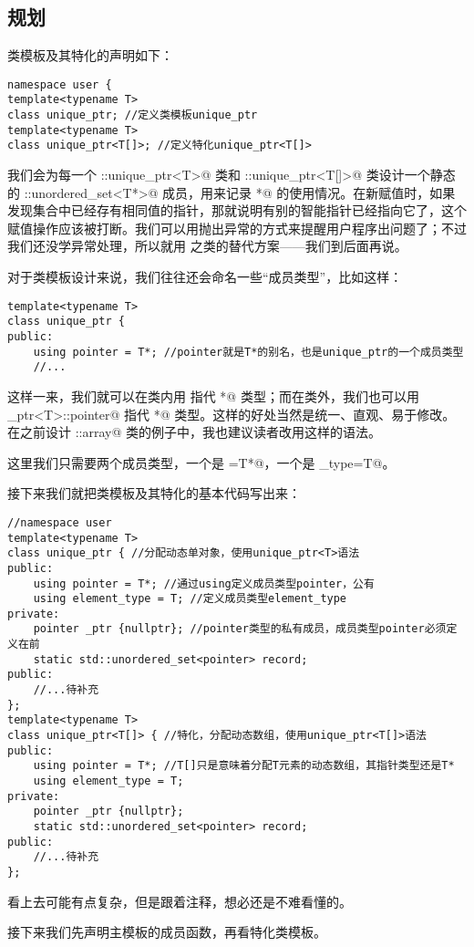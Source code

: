 \subsection*{规划}
类模板及其特化的声明如下：
\begin{lstlisting}
namespace user {
template<typename T>
class unique_ptr; //定义类模板unique_ptr
template<typename T>
class unique_ptr<T[]>; //定义特化unique_ptr<T[]>
\end{lstlisting}\par
我们会为每一个 \lstinline@user::unique_ptr<T>@ 类和 \lstinline@user::unique_ptr<T[]>@ 类设计一个静态的 \lstinline@user::unordered_set<T*>@ 成员，用来记录 \lstinline@T*@ 的使用情况。在新赋值时，如果发现集合中已经存有相同值的指针，那就说明有别的智能指针已经指向它了，这个赋值操作应该被打断。我们可以用抛出异常的方式来提醒用户程序出问题了；不过我们还没学异常处理，所以就用 \lstinline@nullptr@ 之类的替代方案——我们到后面再说。\par
对于类模板设计来说，我们往往还会命名一些``成员类型''，比如这样：
\begin{lstlisting}
template<typename T>
class unique_ptr {
public:
    using pointer = T*; //pointer就是T*的别名，也是unique_ptr的一个成员类型
    //...
\end{lstlisting}
这样一来，我们就可以在类内用 \lstinline@pointer@ 指代 \lstinline@T*@ 类型；而在类外，我们也可以用 \lstinline@unique_ptr<T>::pointer@ 指代 \lstinline@T*@ 类型。这样的好处当然是统一、直观、易于修改。在之前设计 \lstinline@user::array@ 类的例子中，我也建议读者改用这样的语法。\par
这里我们只需要两个成员类型，一个是 \lstinline@pointer=T*@，一个是 \lstinline@element_type=T@。\par
接下来我们就把类模板及其特化的基本代码写出来：
\begin{lstlisting}
//namespace user
template<typename T>
class unique_ptr { //分配动态单对象，使用unique_ptr<T>语法
public:
    using pointer = T*; //通过using定义成员类型pointer，公有
    using element_type = T; //定义成员类型element_type
private:
    pointer _ptr {nullptr}; //pointer类型的私有成员，成员类型pointer必须定义在前
    static std::unordered_set<pointer> record;
public:
    //...待补充
};
template<typename T>
class unique_ptr<T[]> { //特化，分配动态数组，使用unique_ptr<T[]>语法
public:
    using pointer = T*; //T[]只是意味着分配T元素的动态数组，其指针类型还是T*
    using element_type = T;
private:
    pointer _ptr {nullptr};
    static std::unordered_set<pointer> record;
public:
    //...待补充
};
\end{lstlisting}
看上去可能有点复杂，但是跟着注释，想必还是不难看懂的。\par
接下来我们先声明主模板的成员函数，再看特化类模板。\par
